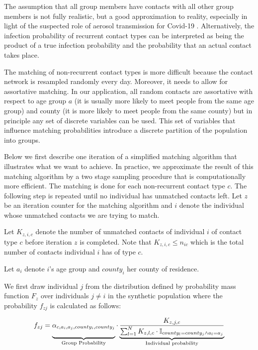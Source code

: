 The assumption that all group members have contacts with all other group members
is not fully realistic, but a good approximation to reality, especially in
light of the suspected role of aerosol transmission for Covid-19 \citep{Morawska2020,
Anderson2020}. Alternatively, the infection probability of recurrent contact types can
be interpreted as being the product of a true infection probability and the probability
that an actual contact takes place.


The matching of non-recurrent contact types is more difficult because the contact
network is resampled randomly every day. Moreover, it needs to allow for
assortative matching. In our application, all
random contacts are assortative with respect to age group $a$ (it is usually more likely
to meet
people from the same age group) and county (it is more likely to meet people from the
same county) but in principle any set of discrete variables can be used. This set of
variables that influence matching probabilities introduce a discrete partition of the
population into groups.

Below we first describe one iteration of a simplified matching algorithm that
illustrates what we want to achieve. In practice, we approximate the result of this
matching algorithm by a two stage sampling procedure that is computationally more
efficient. The matching is done for each non-recurrent contact type $c$. The following
step is repeated until no individual has unmatched contacts left. Let $z$ be an iteration
counter for the matching algorithm and $i$ denote the individual whose unmatched
contacts we are trying to match.

Let $K_{z,i,c}$ denote the number of unmatched contacts of individual $i$ of contact type
$c$ before iteration $z$ is completed. Note that $K_{z,i,c} \leq n_{ic}$ which is the
total number of contacts individual $i$ has of type $c$.

Let $a_i$ denote $i$'s age group and $county_i$ her county of residence.

We first draw individual $j$ from the distribution defined by probability mass function
$F_{z}$ over individuals $j \neq i$ in the synthetic population where the probability
$f_{zj}$ is calculated as follows:

\begin{equation}
    \label{eq:combined_matching_probabilities}
    f_{zj} = \underbrace{\alpha_{c,a_i,a_j, county_i, county_j}\vphantom{\frac{bla}{\sum_i^k}}}_{\text{Group Probability}} \cdot \underbrace{\frac{K_{z,j,c}}{\sum_{l=1}^N K_{z,l,c} \cdot \mathbb{I}_{county_l=county_j \land a_l = a_j}}}_{\text{Individual probability}}
\end{equation}

